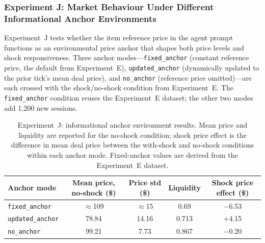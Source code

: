 \subsubsection{Experiment J: Market Behaviour Under Different Informational Anchor Environments}
\label{sec:results-anchor}

Experiment~J tests whether the item reference price in the agent prompt functions as an environmental price anchor that shapes both price levels and shock responsiveness.  Three anchor modes---\texttt{fixed\_anchor} (constant reference price, the default from Experiment~E), \texttt{updated\_anchor} (dynamically updated to the prior tick's mean deal price), and \texttt{no\_anchor} (reference price omitted)---are each crossed with the shock/no-shock condition from Experiment~E.  The \texttt{fixed\_anchor} condition reuses the Experiment~E dataset; the other two modes add 1{,}200 new sessions.

\begin{table}[ht]
\centering
\caption{Experiment~J: informational anchor environment results.  Mean price and liquidity are reported for the no-shock condition; shock price effect is the difference in mean deal price between the with-shock and no-shock conditions within each anchor mode.  Fixed-anchor values are derived from the Experiment~E dataset.}
\label{tab:anchor-environment}
\begin{tabular}{@{}lcccc@{}}
\toprule
Anchor mode & Mean price, no-shock (\$) & Price std (\$) & Liquidity & Shock price effect (\$) \\
\midrule
\texttt{fixed\_anchor}   & $\approx$109 & $\approx$15  & 0.69 & $-$6.53 \\
\texttt{updated\_anchor} & 78.84    & 14.16 & 0.713 & $+$4.15 \\
\texttt{no\_anchor}      & 99.21    & 7.73  & 0.867 & $-$0.20 \\
\bottomrule
\end{tabular}
\end{table}

